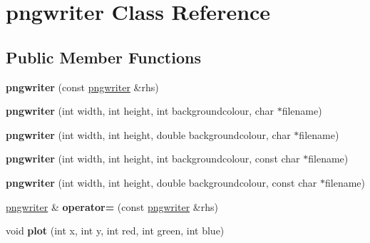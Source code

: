 \hypertarget{classpngwriter}{}\section{pngwriter Class Reference}
\label{classpngwriter}
\subsection*{Public Member Functions}
\begin{DoxyCompactItemize}
\item 
\hypertarget{classpngwriter_ac2b7f81cbb3ce95727d49c91a6717bc5}{}{\bfseries pngwriter} (const \hyperlink{classpngwriter}{pngwriter} \&rhs)\label{classpngwriter_ac2b7f81cbb3ce95727d49c91a6717bc5}

\item 
\hypertarget{classpngwriter_a4641e0c107730df082ce825795c087f9}{}{\bfseries pngwriter} (int width, int height, int backgroundcolour, char $\ast$filename)\label{classpngwriter_a4641e0c107730df082ce825795c087f9}

\item 
\hypertarget{classpngwriter_a358f3c4572210e746080ec32fa976fdd}{}{\bfseries pngwriter} (int width, int height, double backgroundcolour, char $\ast$filename)\label{classpngwriter_a358f3c4572210e746080ec32fa976fdd}

\item 
\hypertarget{classpngwriter_ac48bdc417a63173a948f1215aa1413dd}{}{\bfseries pngwriter} (int width, int height, int backgroundcolour, const char $\ast$filename)\label{classpngwriter_ac48bdc417a63173a948f1215aa1413dd}

\item 
\hypertarget{classpngwriter_aa90eaeb01ce8238e08cf3d9ff589bede}{}{\bfseries pngwriter} (int width, int height, double backgroundcolour, const char $\ast$filename)\label{classpngwriter_aa90eaeb01ce8238e08cf3d9ff589bede}

\item 
\hypertarget{classpngwriter_a8145a0d4d00efae748a8b3b5c3e51e1c}{}\hyperlink{classpngwriter}{pngwriter} \& {\bfseries operator=} (const \hyperlink{classpngwriter}{pngwriter} \&rhs)\label{classpngwriter_a8145a0d4d00efae748a8b3b5c3e51e1c}

\item 
\hypertarget{classpngwriter_a4ff81f69bb6ea639f9d1f88cf9e1c1f2}{}void {\bfseries plot} (int x, int y, int red, int green, int blue)\label{classpngwriter_a4ff81f69bb6ea639f9d1f88cf9e1c1f2}


\end{DoxyCompactItemize}

